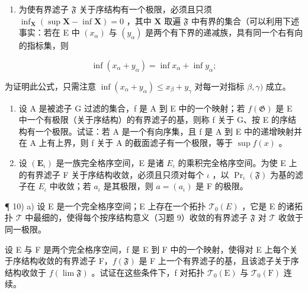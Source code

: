 \begin{enumerate}
\def\labelenumi{\alph{enumi})}
\tightlist
\item
  为使有界滤子 \(\mathfrak{F}\) 关于序结构有一个极限，必须且只须 \(\inf_{\mathbf{X}} (\sup \mathbf{X} - \inf \mathbf{X}) = 0\) ，其中 \(\mathbf{X}\) 取遍 \(\mathfrak{F}\) 中有界的集合（可以利用下述事实：若在 E 中 \((x_{\alpha})\) 与 \((y_{\alpha})\) 是两个有下界的递减族，具有同一个右有向的指标集，则
\end{enumerate}

\[
\inf (x _ {\alpha} + y _ {\alpha}) = \inf x _ {\alpha} + \inf y _ {\alpha};
\]

为证明此公式，只需注意 \(\inf (x_{\alpha} + y_{\alpha})\leqslant x_{\beta} + y_{\gamma}\) 对每一对指标 \(\beta ,\gamma)\) 成立。

\begin{enumerate}
\def\labelenumi{\alph{enumi})}
\setcounter{enumi}{1}
\item
  设 A 是被滤子 G 过滤的集合，f 是 A 到 E 中的一个映射；若 \(f(\mathfrak{G})\) 是 E 中一个有极限（关于序结构）的有界滤子的基，则称 f 关于 G、按 E 的序结构有一个极限。试证：若 A 是一个有向序集，且 f 是 A 到 E 中的递增映射并在 A 上有上界，则 f 关于 A 的截面滤子有一个极限，等于 \(\sup f(x)\) 。
\item
  设 \((\mathbf{E}_{\iota})\) 是一族完全格序空间，E 是诸 \(E_{\iota}\) 的乘积完全格序空间。为使 E 上的有界滤子 F 关于序结构收敛，必须且只须对每个 \(\iota\) ，以 \(\Pr_{\iota}(\mathfrak{F})\) 为基的滤子在 \(E_{\iota}\) 中收敛；若 \(a_{\iota}\) 是其极限，则 \(a = (a_{\iota})\) 是 F 的极限。
\end{enumerate}

¶ 10) a) 设 E 是一个完全格序空间；E 上存在一个拓扑 \(\mathcal{T}_0(E)\) ，它是 E 的诸拓扑 \(\mathcal{T}\) 中最细的，使得每个按序结构意义（习题 9）收敛的有界滤子 \(\mathfrak{F}\) 对 \(\mathcal{T}\) 收敛于同一极限。

设 E 与 F 是两个完全格序空间，f 是 E 到 F 中的一个映射，使得对 E 上每个关于序结构收敛的有界滤子 F，\(f(\mathfrak{F})\) 是 F 上一个有界滤子的基，且该滤子关于序结构收敛于 \(f(\lim \mathfrak{F})\) 。试证在这些条件下，f 对拓扑 \(\mathcal{T}_{0}(\mathrm{E})\) 与 \(\mathcal{T}_{0}(\mathrm{F})\) 连续。

